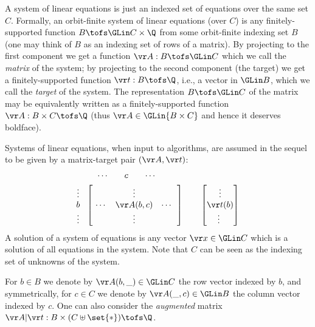 A system of linear equations is just an indexed set of equations over the same set $C$.
Formally, an orbit-finite system of linear equations (over $C$)
is any finitely-supported function $B\tofs \GLin C \times \Q$
from some orbit-finite indexing set $B$ (one may think of $B$ as an indexing set of rows of a matrix).
By projecting to the first component we get a function $\vr A : B\tofs \GLin C$
which we call the \emph{matrix} of the system;
by projecting to the second component (the target) 
we get a finitely-supported function $\vr t : B \tofs \Q$, i.e., a vector in $\GLin B$, 
which we call  the \emph{target} of the system.
The representation $B\tofs \GLin C$ of the matrix may be equivalently written as
a finitely-supported function $\vr A : B \times C \tofs \Q$
(thus $\vr A \in \GLin {B\times C}$ and hence it deserves boldface).

Systems of linear equations, when input to algorithms,
are assumed in the sequel to be given by a matrix-target pair $(\vr A, \vr t)$:
%
\vspace{-4mm}
\begin{align*}
& \quad\ \ \ \,  \begin{matrix} \ \cdots \quad &  c  & \quad \cdots\ \end{matrix} \\
& \begin{matrix} \vdots \\ b \\ \vdots \end{matrix} \ \ 
\begin{bmatrix}
\  & \vdots & \ \\
\ \cdots & \vr A(b,c) & \cdots\ \  \\
      & \vdots & \  
\end{bmatrix}
\qquad
\begin{bmatrix}
 \vdots \\
 \vr t(b)  \\
      \vdots  \  
\end{bmatrix}
\end{align*}
%
A solution of a system of equations is any vector $\vr x\in\GLin C$ which is a solution of all equations in the system.
%
Note that $C$ can be seen as the indexing set of unknowns of the system.


For $b\in B$ we denote by $\vr A(b, \_) \in \GLin C$ the row vector indexed by $b$,
and symmetrically, for $c\in C$ we denote by $\vr A(\_, c) \in \GLin B$ the column vector indexed by $c$.
One can also consider the \emph{augmented} matrix $\vr A | \vr t : B\times (C\uplus \set{*}) \tofs \Q$.

